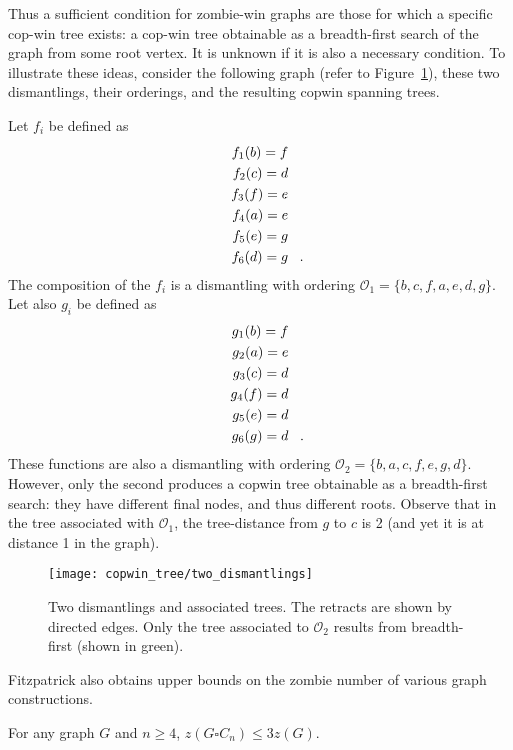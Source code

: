 Thus a sufficient condition for zombie-win graphs are those for which a specific cop-win tree exists: a cop-win tree obtainable as a breadth-first search of the graph from some root vertex. It is unknown if it is also a necessary condition. To illustrate these ideas, consider the following graph (refer to Figure~\ref{fig:two_dismantlings}), these two dismantlings, their orderings, and the resulting copwin spanning trees.

Let $f_i$ be defined as
\begin{align*}
  f_1(b) = f \\
  f_2(c) = d \\
  f_3(f) = e \\
  f_4(a) = e \\
  f_5(e) = g \\
  f_6(d) = g \mperiod
\end{align*}
The composition of the $f_i$ is a dismantling with ordering $\mathcal{O}_1 = \{ b, c, f, a, e, d, g \}$.
Let also $g_i$ be defined as
\begin{align*}
  g_1(b) = f \\
  g_2(a) = e \\
  g_3(c) = d \\
  g_4(f) = d \\
  g_5(e) = d \\
  g_6(g) = d \mperiod
\end{align*}
These functions are also a dismantling with ordering $\mathcal{O}_2 = \{b, a, c, f, e, g, d \}$.
However, only the second produces a copwin tree obtainable as a breadth-first search: they have different final nodes, and thus different roots. Observe that in the tree associated with $\mathcal{O}_1$, the tree-distance from $g$ to $c$ is 2 (and yet it is at distance 1 in the graph).

\begin{figure}
\centering
\texttt{[image: copwin\_tree/two\_dismantlings]}
\caption{Two dismantlings and associated trees. The retracts are shown by directed edges. Only the tree associated to $\mathcal{O}_2$ results from breadth-first (shown in green). \label{fig:two_dismantlings}}
\end{figure}

Fitzpatrick also obtains upper bounds on the zombie number of various graph constructions.
\begin{theorem}
For any graph $G$ and $n \geq 4$, $z ( G \square C_n ) \leq 3 z ( G )$.
\end{theorem}

